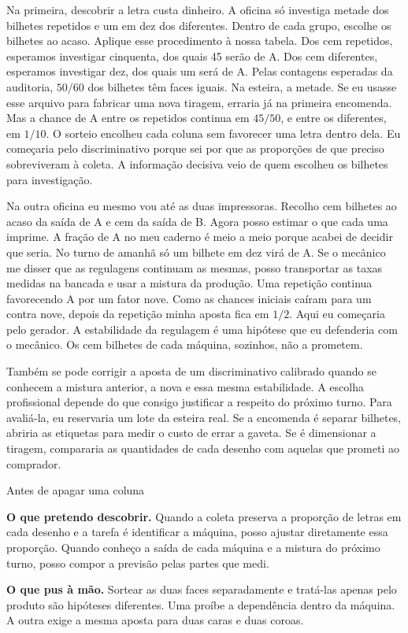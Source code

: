 \documentclass[12pt,oneside]{article}
\newcommand{\itemq}[1]{\par\textbf{#1.}\enspace}
\newcommand{\bookanchor}[1]{\phantomsection\label{#1}}
\begin{document}
Na\bookanchor{topic-05-3} primeira, descobrir a letra custa dinheiro. A oficina só investiga metade dos bilhetes repetidos e um em dez dos diferentes. Dentro de cada grupo, escolhe os bilhetes ao acaso. Aplique esse procedimento à nossa tabela. Dos cem repetidos, esperamos investigar cinquenta, dos quais 45 serão de A. Dos cem diferentes, esperamos investigar dez, dos quais um será de A. Pelas contagens esperadas da auditoria, $50/60$ dos bilhetes têm faces iguais. Na esteira, a metade. Se eu usasse esse arquivo para fabricar uma nova tiragem, erraria já na primeira encomenda. Mas a chance de A entre os repetidos continua em $45/50$, e entre os diferentes, em $1/10$. O sorteio encolheu cada coluna sem favorecer uma letra dentro dela. Eu começaria pelo discriminativo porque sei por que as proporções de que preciso sobreviveram à coleta. A informação decisiva veio de quem escolheu os bilhetes para investigação.

Na\bookanchor{topic-05-5} outra oficina eu mesmo vou até as duas impressoras. Recolho cem bilhetes ao acaso da saída de A e cem da saída de B. Agora posso estimar o que cada uma imprime. A fração de A no meu caderno é meio a meio porque acabei de decidir que seria. No turno de amanhã só um bilhete em dez virá de A. Se o mecânico me disser que as regulagens continuam as mesmas, posso transportar as taxas medidas na bancada e usar a mistura da produção. Uma repetição continua favorecendo A por um fator nove. Como as chances iniciais caíram para um contra nove, depois da repetição minha aposta fica em $1/2$. Aqui eu começaria pelo gerador. A estabilidade da regulagem é uma hipótese que eu defenderia com o mecânico. Os cem bilhetes de cada máquina, sozinhos, não a prometem.

Também se pode corrigir a aposta de um discriminativo calibrado quando se conhecem a mistura anterior, a nova e essa mesma estabilidade. A escolha profissional depende do que consigo justificar a respeito do próximo turno. Para avaliá-la, eu reservaria um lote da esteira real. Se a encomenda é separar bilhetes, abriria as etiquetas para medir o custo de errar a gaveta. Se é dimensionar a tiragem, compararia as quantidades de cada desenho com aquelas que prometi ao comprador.

\begin{quadro}{Antes de apagar uma coluna}
\itemq{O que pretendo descobrir} Quando a coleta preserva a proporção de letras em cada desenho e a tarefa é identificar a máquina, posso ajustar diretamente essa proporção. Quando conheço a saída de cada máquina e a mistura do próximo turno, posso compor a previsão pelas partes que medi.
\itemq{O que pus à mão} Sortear as duas faces separadamente e tratá-las apenas pelo produto são hipóteses diferentes. Uma proíbe a dependência dentro da máquina. A outra exige a mesma aposta para duas caras e duas coroas.
\end{quadro}
\end{document}
